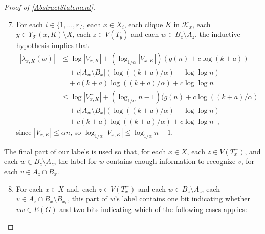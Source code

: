 \documentclass{patmorin}
\renewcommand{\le}{\leqslant}
\begin{document}
\begin{proof}[Proof of \cref{AbstractStatement}]
    \begin{enumerate}[nosep,nolistsep,label=(P\arabic*)]\setcounter{enumi}{6}
      \item\label{recursive_part} For each $i\in\{1,\ldots,r\}$, each $x\in X_i$,  each clique $K$ in $\mathcal{K}_x$, each $y\in Y_\mathcal{T}(x,K)\setminus X$, each $z\in V(T_y)$ and each $w\in B_z\setminus A_z$, the inductive hypothesis implies that
      \begin{align*}
        |\lambda_{x,K}(w)|
        & \le \log |V^-_{x,K}|+\left(\log_{1/\alpha}|V^-_{x,K}|\right)\left(g(n) + c\log(k+a)\right) \\
        & \quad {} + c|A_w\setminus B_x|(\log((k+a)/\alpha)+\log\log n) \\
        & \quad {} + c(k+a)\log((k+a)/\alpha) + c\log\log n \\
        & \le \log |V^-_{x,K}|+\left(\log_{1/\alpha}n-1\right)(g(n) + c\log((k+a)/\alpha) \\
        & \quad {} + c|A_w\setminus B_x|(\log((k+a)/\alpha)+\log\log n) \\
        & \quad {} + c(k+a)\log((k+a)/\alpha) + c\log\log n
        \enspace ,
      \end{align*}
      since $|V^-_{x,K}|\le \alpha n$, so $\log_{1/\alpha}|V^-_{x,K}|\le \log_{1/\alpha} n - 1$.
    \end{enumerate}
    The final part of our labels is used so that, for each $x\in X$, each $z\in V(T^-_x)$, and each $w\in B_z\setminus A_z$, the label for $w$ contains enough information to recognize $v$, for each $v\in A_z\cap B_x$.


    \begin{enumerate}[nosep,nolistsep,label=(P\arabic*)]\setcounter{enumi}{7}
      \item\label{apex_edges} For each $x\in X$ and, each $z\in V(T^-_x)$ and each $w\in B_z\setminus A_z$, each $v\in A_z\cap B_x\setminus B_{x_0}$, this part of $w$'s label contains one bit indicating whether $vw\in E(G)$ and two bits indicating which of the following cases applies:


\end{enumerate}
\end{proof}
\end{document}
